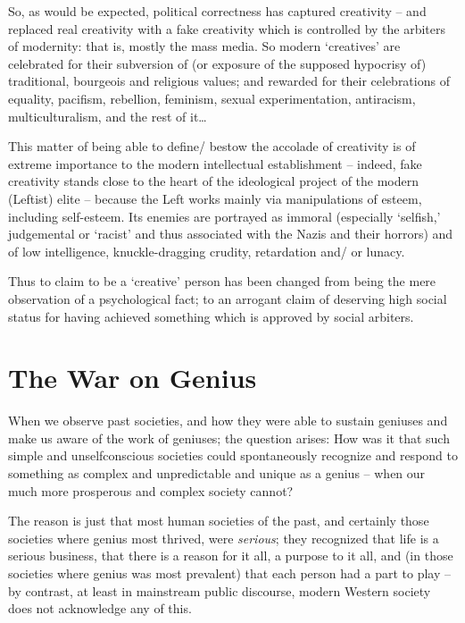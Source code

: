 \documentclass[
]{book}
\begin{document}
So, as would be expected, political correctness has captured creativity -- and replaced real creativity with a fake creativity which is controlled by the arbiters of modernity: that is, mostly the mass media. So modern `creatives' are celebrated for their subversion of (or exposure of the supposed hypocrisy of) traditional, bourgeois and religious values; and rewarded for their celebrations of equality, pacifism, rebellion, feminism, sexual experimentation, antiracism, multiculturalism, and the rest of it\ldots{}

This matter of being able to define/ bestow the accolade of creativity is of extreme importance to the modern intellectual establishment -- indeed, fake creativity stands close to the heart of the ideological project of the modern (Leftist) elite -- because the Left works mainly via manipulations of esteem, including self-esteem. Its enemies are portrayed as immoral (especially `selfish,' judgemental or `racist' and thus associated with the Nazis and their horrors) and of low intelligence, knuckle-dragging crudity, retardation and/ or lunacy.

Thus to claim to be a `creative' person has been changed from being the mere observation of a psychological fact; to an arrogant claim of deserving high social status for having achieved something which is approved by social arbiters.

\hypertarget{the-war-on-genius}{%
\chapter{The War on Genius}\label{the-war-on-genius}}

When we observe past societies, and how they were able to sustain geniuses and make us aware of the work of geniuses; the question arises: How was it that such simple and unselfconscious societies could spontaneously recognize and respond to something as complex and unpredictable and unique as a genius -- when our much more prosperous and complex society cannot?

The reason is just that most human societies of the past, and certainly those societies where genius most thrived, were \emph{serious}; they recognized that life is a serious business, that there is a reason for it all, a purpose to it all, and (in those societies where genius was most prevalent) that each person had a part to play -- by contrast, at least in mainstream public discourse, modern Western society does not acknowledge any of this.
\end{document}
